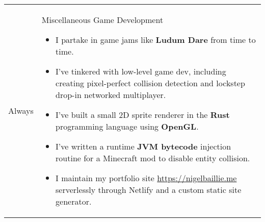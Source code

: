 \documentclass[11pt]{article}
\newenvironment{timeline}
        {\begin{tabular}{p{21 mm}|p{150 mm}}}
        {\end{tabular}}
\newenvironment{timelinetitle}
        {\vspace{-2 mm}\begin{large}}
        {\end{large}\vspace{-1.5 mm}}
\newcommand{\timespan}[2]{{#2}\newline{#1}}
\begin{document}
\begin{timeline}
\timespan{2011}{Always}
&
\begin{timelinetitle}
    Miscellaneous Game Development
\end{timelinetitle}
\begin{itemize}
  \item I partake in game jams like \textbf{Ludum Dare} from time to time.

  \item I've tinkered with low-level game dev, including creating pixel-perfect collision detection and lockstep drop-in networked multiplayer.

  \item I've built a small 2D sprite renderer in the \textbf{Rust} programming language using \textbf{OpenGL}.

  \item I've written a runtime \textbf{JVM bytecode} injection routine for a Minecraft mod to disable entity collision.
  
  \item I maintain my portfolio site \url{https://nigelbaillie.me} serverlessly through Netlify and a custom static site generator.
\end{itemize}

\end{timeline}
\end{document}
